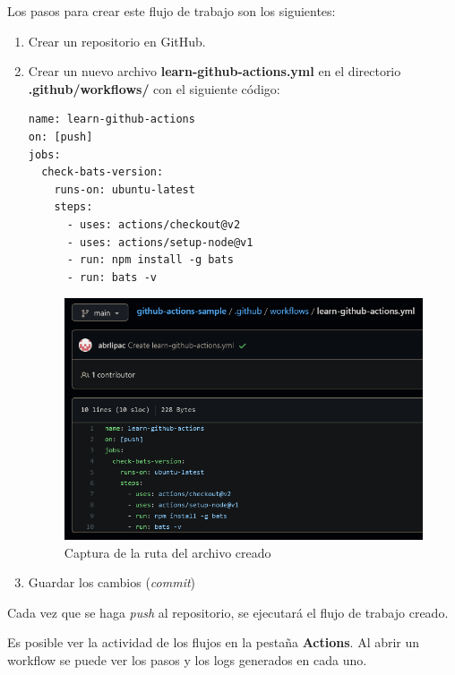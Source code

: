\documentclass[twoside,twocolumn]{article}
\begin{document}
Los pasos para crear este flujo de trabajo son los siguientes:

\begin{enumerate}

    \item Crear un repositorio en GitHub.
    \item Crear un nuevo archivo \textbf{learn-github-actions.yml} en el directorio \textbf{.github/workflows/} con el siguiente código:

\begin{verbatim}
name: learn-github-actions
on: [push]
jobs:
  check-bats-version:
    runs-on: ubuntu-latest
    steps:
      - uses: actions/checkout@v2
      - uses: actions/setup-node@v1
      - run: npm install -g bats
      - run: bats -v
\end{verbatim}

\begin{figure}[h]
    \includegraphics[width = \columnwidth]{Imagenes/Screenshot_1.png}
    \caption{Captura de la ruta del archivo creado}
\end{figure}

    \item Guardar los cambios (\textit{commit})

\end{enumerate}

Cada vez que se haga \textit{push} al repositorio, se ejecutará el flujo de trabajo creado.

Es posible ver la actividad de los flujos en la pestaña \textbf{Actions}. Al abrir un workflow se puede ver los pasos y los logs generados en cada uno.
\end{document}
